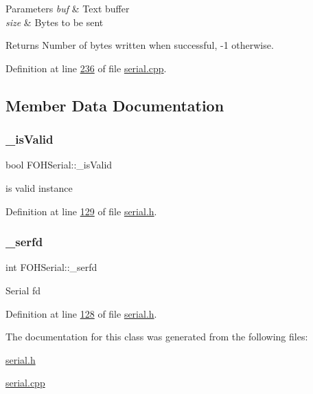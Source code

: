 \begin{DoxyParams}{Parameters}
{\em buf} & Text buffer \\
\hline
{\em size} & Bytes to be sent\\
\hline
\end{DoxyParams}
\begin{DoxyReturn}{Returns}
Number of bytes written when successful, -\/1 otherwise. 
\end{DoxyReturn}


Definition at line \mbox{\hyperlink{serial_8cpp_source_l00236}{236}} of file \mbox{\hyperlink{serial_8cpp_source}{serial.\+cpp}}.



\subsection{Member Data Documentation}
\mbox{\label{classFOHSerial_a26a5f17316ae345ebbdb8d99d3ad2a84}} 
\subsubsection{\texorpdfstring{\+\_\+is\+Valid}{\_isValid}}
{\footnotesize\ttfamily bool F\+O\+H\+Serial\+::\+\_\+is\+Valid\hspace{0.3cm}{\ttfamily [private]}}

is valid instance 

Definition at line \mbox{\hyperlink{serial_8h_source_l00129}{129}} of file \mbox{\hyperlink{serial_8h_source}{serial.\+h}}.

\mbox{\label{classFOHSerial_ab682f6f446d38c7954dfb9cae43b6c73}} 
\subsubsection{\texorpdfstring{\+\_\+serfd}{\_serfd}}
{\footnotesize\ttfamily int F\+O\+H\+Serial\+::\+\_\+serfd\hspace{0.3cm}{\ttfamily [private]}}

Serial fd 

Definition at line \mbox{\hyperlink{serial_8h_source_l00128}{128}} of file \mbox{\hyperlink{serial_8h_source}{serial.\+h}}.



The documentation for this class was generated from the following files\+:\begin{DoxyCompactItemize}
\item 
\mbox{\hyperlink{serial_8h}{serial.\+h}}\item 
\mbox{\hyperlink{serial_8cpp}{serial.\+cpp}}\end{DoxyCompactItemize}
